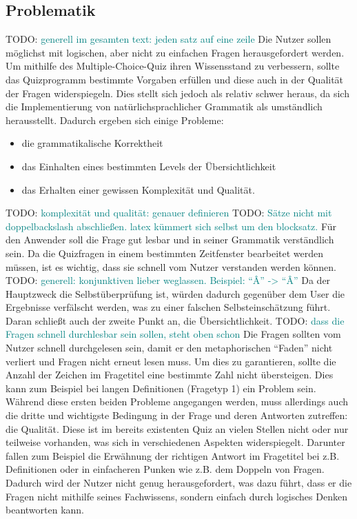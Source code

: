 \documentclass[headsepline,titlepage,ngerman,twoside,12pt]{report}
\newcommand\todo[1]{TODO: \textcolor{teal}{#1}}
\begin{document}
\subsection{Problematik}
\todo{generell im gesamten text: jeden satz auf eine zeile}
Die Nutzer sollen möglichst mit logischen, aber nicht zu einfachen Fragen herausgefordert werden.
Um mithilfe des Multiple-Choice-Quiz ihren Wissensstand zu verbessern, sollte das Quizprogramm bestimmte Vorgaben erfüllen und diese auch in der Qualität der Fragen widerspiegeln.
Dies stellt sich jedoch als relativ schwer heraus, da sich die Implementierung von natürlichsprachlicher Grammatik als umständlich herausstellt.
Dadurch ergeben sich einige Probleme:
\begin{itemize}
    \item die grammatikalische Korrektheit
    \item das Einhalten eines bestimmten Levels der Übersichtlichkeit
    \item das Erhalten einer gewissen Komplexität und Qualität.
\end{itemize}
\todo{komplexität und qualität: genauer definieren}
\todo{Sätze nicht mit doppelbackslash abschließen. latex kümmert sich selbst um den blocksatz.}
Für den Anwender soll die Frage gut lesbar und in seiner Grammatik verständlich sein.
Da die Quizfragen in einem bestimmten Zeitfenster bearbeitet werden müssen, ist es wichtig, dass sie schnell vom Nutzer verstanden werden können.
\todo{generell: konjunktiven lieber weglassen. Beispiel: \enquote{Â} -> \enquote{Â}}
Da der Hauptzweck die Selbstüberprüfung ist, würden dadurch gegenüber dem User die Ergebnisse verfälscht werden, was zu einer falschen Selbsteinschätzung führt.
Daran schließt auch der zweite Punkt an, die Übersichtlichkeit.
\todo{dass die Fragen schnell durchlesbar sein sollen, steht oben schon}
Die Fragen sollten vom Nutzer schnell durchgelesen sein, damit er den metaphorischen \enquote{Faden} nicht verliert und Fragen nicht erneut lesen muss.
Um dies zu garantieren, sollte die Anzahl der Zeichen im Fragetitel eine bestimmte Zahl nicht übersteigen.
Dies kann zum Beispiel bei langen Definitionen (Fragetyp 1) ein Problem sein.
Während diese ersten beiden Probleme angegangen werden, muss allerdings auch die dritte und wichtigste Bedingung in der Frage und deren Antworten zutreffen: die Qualität.
Diese ist im bereits existenten Quiz an vielen Stellen nicht oder nur teilweise vorhanden, was sich in verschiedenen Aspekten widerspiegelt.
Darunter fallen zum Beispiel die Erwähnung der richtigen Antwort im Fragetitel bei z.B. Definitionen oder in einfacheren Punken wie z.B. dem Doppeln von Fragen.
Dadurch wird der Nutzer nicht genug herausgefordert, was dazu führt, dass er die Fragen nicht mithilfe seines Fachwissens, sondern einfach durch logisches Denken beantworten kann. 
\end{document}
